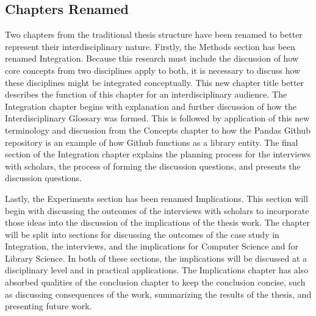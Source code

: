 \subsection{Chapters Renamed}

Two chapters from the traditional thesis structure have been renamed to better represent their interdisciplinary nature. Firstly, the Methods section has been renamed Integration. Because this research must include the discussion of how core concepts from two disciplines apply to both, it is necessary to discuss how these disciplines might be integrated conceptually. This new chapter title better describes the function of this chapter for an interdisciplinary audience. The Integration chapter begins with explanation and further discussion of how the Interdisciplinary Glossary was formed. This is followed by application of this new terminology and discussion from the Concepts chapter to how the Pandas Github repository is an example of how Github functions as a library entity. The final section of the Integration chapter explains the planning process for the interviews with scholars, the process of forming the discussion questions, and presents the discussion questions. 

Lastly, the Experiments section has been renamed Implications. This section will begin with discussing the outcomes of the interviews with scholars to incorporate those ideas into the discussion of the implications of the thesis work. The chapter will be split into sections for discussing the outcomes of the case study in Integration, the interviews, and the implications for Computer Science and for Library Science. In both of these sections, the implications will be discussed at a disciplinary level and in practical applications. The Implications chapter has also absorbed qualities of the conclusion chapter to keep the conclusion concise, such as discussing consequences of the work, summarizing the results of the thesis, and presenting future work. 
